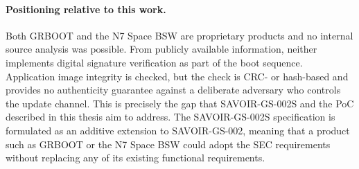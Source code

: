 \paragraph{Positioning relative to this work.}
Both GRBOOT and the N7 Space BSW are proprietary products and no internal source analysis was possible. From publicly available information, neither implements digital signature verification as part of the boot sequence. Application image integrity is checked, but the check is CRC- or hash-based and provides no authenticity guarantee against a deliberate adversary who controls the update channel. This is precisely the gap that SAVOIR-GS-002S and the PoC described in this thesis aim to address. The SAVOIR-GS-002S specification is formulated as an additive extension to SAVOIR-GS-002, meaning that a product such as GRBOOT or the N7 Space BSW could adopt the SEC requirements without replacing any of its existing functional requirements.